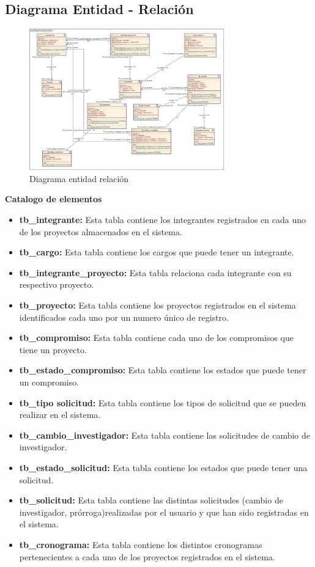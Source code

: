 \documentclass[12pt,oneside,letterpaper]{report}
\begin{document}
\subsection{Diagrama Entidad - Relación}

\begin{figure}[h!]
  \centering
    \includegraphics[width=0.75\textwidth]{./img/img8.png}
  \caption{Diagrama entidad relación}
\end{figure}


\textbf{Catalogo de elementos}\\

\begin{itemize}
 \item \textbf{tb\_integrante:} Esta tabla contiene los integrantes registrados en cada uno de los proyectos almacenados en el sistema.
 \item \textbf{tb\_cargo:} Esta tabla contiene los cargos que puede tener un integrante.
 \item \textbf{tb\_integrante\_proyecto:} Esta tabla relaciona cada integrante con su respectivo proyecto.
 \item \textbf{tb\_proyecto:} Esta tabla contiene los proyectos registrados en el sistema identificados cada uno por un numero único de registro.
 \item \textbf{tb\_compromiso:} Esta tabla contiene cada uno de los compromisos que tiene un proyecto.
 \item \textbf{tb\_estado\_compromiso:} Esta tabla contiene los estados que puede tener un compromiso.
 \item \textbf{tb\_tipo solicitud:} Esta tabla contiene los tipos de solicitud que se pueden realizar en el sistema.
 \item \textbf{tb\_cambio\_investigador:} Esta tabla contiene las solicitudes de cambio de investigador.
 \item \textbf{tb\_estado\_solicitud:} Esta tabla contiene los estados que puede tener una solicitud.
 \item \textbf{tb\_solicitud:} Esta tabla contiene las distintas solicitudes (cambio de investigador, prórroga)realizadas por el usuario y que han sido registradas en el sistema.
 \item \textbf{tb\_cronograma:} Esta tabla contiene los distintos cronogramas pertenecientes a cada uno de los proyectos registrados en el sistema.
\end{itemize}
\end{document}
